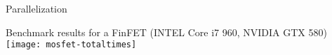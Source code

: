 \begin{frame}{Parallelization}
  \begin{center}
   Benchmark results for a FinFET (INTEL Core i7 960, NVIDIA GTX 580) \\
   \vspace*{0.5cm}
   \texttt{[image: mosfet-totaltimes]}
  \end{center}
\end{frame}


